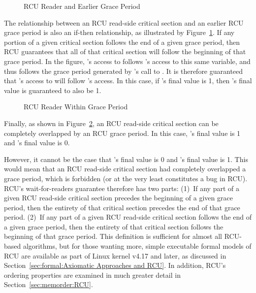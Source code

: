 \begin{figure}[tbp]
\centering
{}
\caption{RCU Reader and Earlier Grace Period}
\label{fig:defer:RCU Reader and Earlier Grace Period}
\end{figure}

The relationship between an RCU read-side critical section and an earlier
RCU grace period is also an if-then relationship, as illustrated by
Figure~\ref{fig:defer:RCU Reader and Earlier Grace Period}.
If any portion of a given critical section follows the end of
a given grace period, then RCU guarantees that all of that critical
section will follow the beginning of that grace period.
In the figure, 's access to  follows 's access
to this same variable, and thus follows the grace period generated by
's call to .
It is therefore guaranteed that 's access to  will follow
's access.  In this case, if 's final value is 1, then
's final value is guaranteed to also be 1.

\QuickQuizEnd

\begin{figure}[tbp]
\centering
{}
\caption{RCU Reader Within Grace Period}
\label{fig:defer:RCU Reader Within Grace Period}
\end{figure}

Finally, as shown in
Figure~\ref{fig:defer:RCU Reader Within Grace Period},
an RCU read-side critical section can be completely overlapped by
an RCU grace period.
In this case, 's final value is 1 and 's final value is 0.

However, it cannot be the case that 's final value is 0 and 's
final value is 1.
This would mean that an RCU read-side critical section had completely
overlapped a grace period, which is forbidden (or at the very least
constitutes a bug in RCU).
RCU's wait-for-readers guarantee therefore has two parts:
(1)~If any part of a given RCU read-side critical section precedes
the beginning of a given grace period, then the entirety of that
critical section precedes the end of that grace period.
(2)~If any part of a given RCU read-side critical section follows
the end of a given grace period, then the entirety of that
critical section follows the beginning of that grace period.
This definition is sufficient for almost all RCU-based algorithms, but
for those wanting more,
simple executable formal models of RCU are available
as part of Linux kernel v4.17 and later, as discussed in
Section~\ref{sec:formal:Axiomatic Approaches and RCU}.
In addition, RCU's ordering properties are examined in much
greater detail in Section~\ref{sec:memorder:RCU}.

